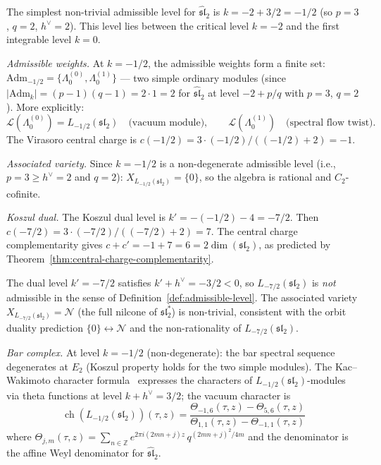 \begin{example}[\texorpdfstring{$\widehat{\mathfrak{sl}}_2$}{sl-hat_2} at admissible level
\texorpdfstring{$k = -1/2$}{k = -1/2}]
\label{ex:sl2-admissible}
The simplest non-trivial admissible level for
$\widehat{\mathfrak{sl}}_2$ is $k = -2 + 3/2 = -1/2$
(so $p = 3$, $q = 2$, $h^\vee = 2$).  This level lies between
the critical level $k = -2$ and the first integrable level $k = 0$.

\emph{Admissible weights.}
At $k = -1/2$, the admissible weights form a finite set:
$\mathrm{Adm}_{-1/2} = \{\Lambda_0^{(0)}, \Lambda_0^{(1)}\}$
--- two simple ordinary modules
(since $|\mathrm{Adm}_k| = (p - 1)(q - 1) = 2 \cdot 1 = 2$
for $\widehat{\mathfrak{sl}}_2$ at level $-2 + p/q$ with
$p = 3$, $q = 2$).  More explicitly:
\[
\mathcal{L}(\Lambda_0^{(0)}) = L_{-1/2}(\mathfrak{sl}_2)
\quad\text{(vacuum module)},
\qquad
\mathcal{L}(\Lambda_0^{(1)})
\quad\text{(spectral flow twist)}.
\]
The Virasoro central charge is
$c(-1/2) = 3 \cdot (-1/2)/((-1/2) + 2) = -1$.

\emph{Associated variety.}
Since $k = -1/2$ is a non-degenerate admissible level
(i.e., $p = 3 \geq h^\vee = 2$ and $q = 2$):
$X_{L_{-1/2}(\mathfrak{sl}_2)} = \{0\}$, so the algebra is
rational and $C_2$-cofinite.

\emph{Koszul dual.}
The Koszul dual level is $k' = -(-1/2) - 4 = -7/2$.  Then
$c(-7/2) = 3 \cdot (-7/2)/((-7/2) + 2) = 7$.  The central
charge complementarity gives $c + c' = -1 + 7 = 6 =
2\dim(\mathfrak{sl}_2)$, as predicted by
Theorem~\ref{thm:central-charge-complementarity}.

The dual level $k' = -7/2$ satisfies
$k' + h^\vee = -3/2 < 0$, so $L_{-7/2}(\mathfrak{sl}_2)$
is \emph{not} admissible in the sense of
Definition~\ref{def:admissible-level}.  The associated variety
$X_{L_{-7/2}(\mathfrak{sl}_2)} = \mathcal{N}$
(the full nilcone of $\mathfrak{sl}_2^*$) is non-trivial,
consistent with the orbit duality prediction
$\{0\} \leftrightarrow \mathcal{N}$ and the non-rationality
of $L_{-7/2}(\mathfrak{sl}_2)$.

\emph{Bar complex.}
At level $k = -1/2$ (non-degenerate): the bar spectral sequence
degenerates at $E_2$ (Koszul property holds for the two simple
modules).  The Kac--Wakimoto character formula~\cite{KW88}
expresses the characters of $L_{-1/2}(\mathfrak{sl}_2)$-modules
via theta functions at level $k + h^\vee = 3/2$; the vacuum
character is
\[
\operatorname{ch}(L_{-1/2}(\mathfrak{sl}_2))(\tau, z)
= \frac{\Theta_{-1,6}(\tau, z) - \Theta_{5,6}(\tau, z)}
  {\Theta_{1,1}(\tau, z) - \Theta_{-1,1}(\tau, z)}
\]
where $\Theta_{j,m}(\tau, z) = \sum_{n \in \mathbb{Z}}
e^{2\pi i(2mn+j)z}\, q^{(2mn+j)^2/4m}$ and the denominator is
the affine Weyl denominator for $\widehat{\mathfrak{sl}}_2$.
\end{example}

